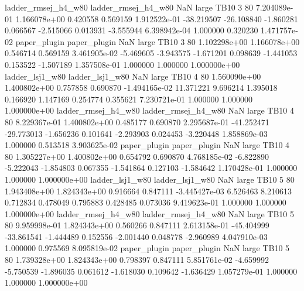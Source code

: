 ladder_rmsej_h4_w80 ladder_rmsej_h4_w80                   NaN      large     TB10                 3 80 7.204089e-01   1.166078e+00      0.420558       0.569159  1.912522e-01    -38.219507    -26.108840    -1.860281       0.066567 -2.515066   0.013931    -3.555944   6.398942e-04            1.000000        0.320230        1.471757e-02
       paper_plugin        paper_plugin                   NaN      large     TB10                 3 80 1.102298e+00   1.166078e+00      0.546714       0.569159  3.461905e-02     -5.469605     -3.943575    -1.671201       0.098639 -1.441053   0.153522    -1.507189   1.357508e-01            1.000000        1.000000        1.000000e+00
    ladder_lsj1_w80     ladder_lsj1_w80                   NaN      large     TB10                 4 80 1.560090e+00   1.400802e+00      0.757858       0.690870 -1.494165e-02     11.371221      9.696214     1.395018       0.166920  1.147169   0.254774     0.355621   7.230721e-01            1.000000        1.000000        1.000000e+00
ladder_rmsej_h4_w80 ladder_rmsej_h4_w80                   NaN      large     TB10                 4 80 8.229367e-01   1.400802e+00      0.485177       0.690870  2.295687e-01    -41.252471    -29.773013    -1.656236       0.101641 -2.293903   0.024453    -3.220448   1.858869e-03            1.000000        0.513518        3.903625e-02
       paper_plugin        paper_plugin                   NaN      large     TB10                 4 80 1.305227e+00   1.400802e+00      0.654792       0.690870  4.768185e-02     -6.822890     -5.222043    -1.854803       0.067355 -1.541864   0.127103    -1.584642   1.170428e-01            1.000000        1.000000        1.000000e+00
    ladder_lsj1_w80     ladder_lsj1_w80                   NaN      large     TB10                 5 80 1.943408e+00   1.824343e+00      0.916664       0.847111 -3.445427e-03      6.526463      8.210613     0.712834       0.478049  0.795883   0.428485     0.073036   9.419623e-01            1.000000        1.000000        1.000000e+00
ladder_rmsej_h4_w80 ladder_rmsej_h4_w80                   NaN      large     TB10                 5 80 9.959998e-01   1.824343e+00      0.560266       0.847111  2.613158e-01    -45.404999    -33.861541    -1.444489       0.152556 -2.001440   0.048778    -2.960989   4.047910e-03            1.000000        0.975569        8.095819e-02
       paper_plugin        paper_plugin                   NaN      large     TB10                 5 80 1.739328e+00   1.824343e+00      0.798397       0.847111  5.851761e-02     -4.659992     -5.750539    -1.896035       0.061612 -1.618030   0.109642    -1.636429   1.057279e-01            1.000000        1.000000        1.000000e+00
